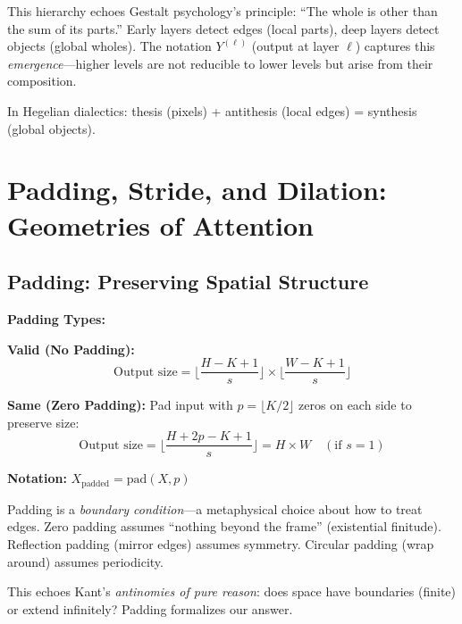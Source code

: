 \begin{philosophical}
	This hierarchy echoes Gestalt psychology's principle: ``The whole is other than the sum of its parts.'' Early layers detect edges (local parts), deep layers detect objects (global wholes). The notation $Y^{(\ell)}$ (output at layer $\ell$) captures this \textit{emergence}---higher levels are not reducible to lower levels but arise from their composition.
	
	In Hegelian dialectics: thesis (pixels) + antithesis (local edges) = synthesis (global objects).
\end{philosophical}

\section{Padding, Stride, and Dilation: Geometries of Attention}

\subsection{Padding: Preserving Spatial Structure}

\begin{seanbox}{3.2}
	\textbf{Padding Types:}
	
	\textbf{Valid (No Padding):}
	\begin{equation}
		\text{Output size} = \lfloor \frac{H - K + 1}{s} \rfloor \times \lfloor \frac{W - K + 1}{s} \rfloor
	\end{equation}
	
	\textbf{Same (Zero Padding):}
	Pad input with $p = \lfloor K/2 \rfloor$ zeros on each side to preserve size:
	\begin{equation}
		\text{Output size} = \lfloor \frac{H + 2p - K + 1}{s} \rfloor = H \times W \quad (\text{if } s=1)
	\end{equation}
	
	\textbf{Notation:} $X_{\text{padded}} = \text{pad}(X, p)$
\end{seanbox}

\begin{philosophical}
	Padding is a \textit{boundary condition}---a metaphysical choice about how to treat edges. Zero padding assumes ``nothing beyond the frame'' (existential finitude). Reflection padding (mirror edges) assumes symmetry. Circular padding (wrap around) assumes periodicity.
	
	This echoes Kant's \textit{antinomies of pure reason}: does space have boundaries (finite) or extend infinitely? Padding formalizes our answer.
\end{philosophical}


